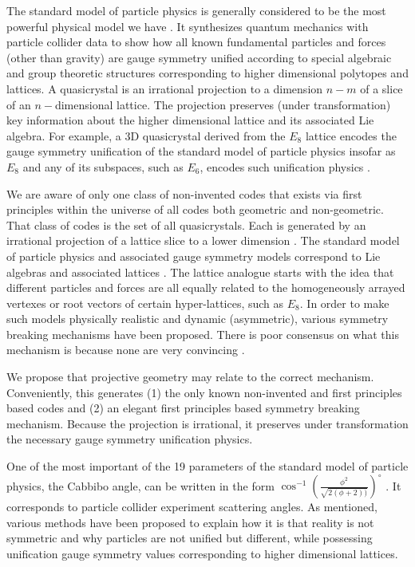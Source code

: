 \documentclass[submission,copyright,creativecommons]{eptcs}
\begin{document}
The standard model of particle physics is generally considered to be the most powerful physical model we have \cite{oerter2006theory}. It synthesizes quantum mechanics with particle collider data to show how all known fundamental particles and forces (other than gravity) are gauge symmetry unified according to special algebraic and group theoretic structures corresponding to higher dimensional polytopes and lattices. A quasicrystal is an irrational projection to a dimension $n-m$ of a slice of an $n-$dimensional lattice. The projection preserves (under transformation) key information about the higher dimensional lattice and its associated Lie algebra. For example, a 3D quasicrystal derived from the $E_{8}$ lattice encodes the gauge symmetry unification of the standard model of particle physics insofar as $E_{8}$ and any of its subspaces, such as $E_{6}$, encodes such unification physics \cite{gursey1976universal}.

We are aware of only one class of non-invented codes that exists via first principles within the universe of all codes both geometric and non-geometric. That class of codes is the set of all quasicrystals. Each is generated by an irrational projection of a lattice slice to a lower dimension \cite{jaric2012introduction}. The standard model of particle physics and associated gauge symmetry models correspond to Lie algebras and associated lattices \cite{becker2006string}. The lattice analogue starts with the idea that different particles and forces are all equally related to the homogeneously arrayed vertexes or root vectors of certain hyper-lattices, such as $E_{8}$. In order to make such models physically realistic and dynamic (asymmetric), various symmetry breaking mechanisms have been proposed. There is poor consensus on what this mechanism is because none are very convincing \cite{weinberg1992dream}.

We propose that projective geometry may relate to the correct mechanism. Conveniently, this generates (1) the only known non-invented and first principles based codes and (2) an elegant first principles based symmetry breaking mechanism. Because the projection is irrational, it preserves under transformation the necessary gauge symmetry unification physics.

One of the most important of the 19 parameters of the standard model of particle physics, the Cabbibo angle, can be written in the form $\cos^{-1} \left (\frac{\phi^2}{\sqrt{2(\phi +2))}}  \right )^{\circ} $ \cite{kajiyama2007golden,king2013neutrino,king2012tri,minakata2004neutrino}. It corresponds to particle collider experiment scattering angles. As mentioned, various methods have been proposed to explain how it is that reality is not symmetric and why particles are not unified but different, while possessing unification gauge symmetry values corresponding to higher dimensional lattices.
\end{document}

